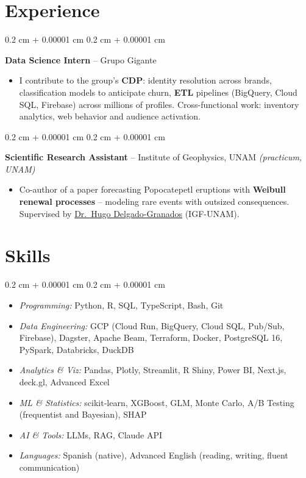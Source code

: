 \documentclass[10pt, letterpaper]{article}
\newenvironment{highlights}{
    \begin{itemize}[
        topsep=0.05 cm,
        parsep=0.05 cm,
        partopsep=0pt,
        itemsep=0pt,
        leftmargin=0.4 cm + 10pt
    ]
}{
    \end{itemize}
}
\newenvironment{highlightsforbulletentries}{
    \begin{itemize}[
        topsep=0.02 cm,
        parsep=0.05 cm,
        partopsep=0pt,
        itemsep=0pt,
        leftmargin=10pt
    ]
}{
    \end{itemize}
}
\newenvironment{onecolentry}{
    \begin{adjustwidth}{
        0.2 cm + 0.00001 cm
    }{
        0.2 cm + 0.00001 cm
    }
}{
    \end{adjustwidth}
}
\let\hrefWithoutArrow\href
\renewcommand{\href}[2]{\hrefWithoutArrow{#1}{\ifthenelse{\equal{#2}{}}{ }{#2 }\raisebox{.15ex}{\footnotesize \faExternalLink*}}}
\begin{document}
    \section{Experience}

        \begin{onecolentry}
            \textbf{Data Science Intern} -- Grupo Gigante
            \begin{highlights}
                \item I contribute to the group's \textbf{CDP}: identity resolution across brands, classification models to anticipate churn, \textbf{ETL} pipelines (BigQuery, Cloud SQL, Firebase) across millions of profiles. Cross-functional work: inventory analytics, web behavior and audience activation.
            \end{highlights}
            \end{onecolentry}

        \vspace{0.02 cm}

        \begin{onecolentry}
            \textbf{Scientific Research Assistant} -- Institute of Geophysics, UNAM \textit{(practicum, UNAM)}
            \begin{highlights}
                \item Co-author of a paper forecasting Popocatepetl eruptions with \textbf{Weibull renewal processes} -- modeling rare events with outsized consequences. Supervised by \hrefWithoutArrow{https://scholar.google.com/citations?user=lDD0DZQAAAAJ}{Dr.\ Hugo Delgado-Granados} (IGF-UNAM).
            \end{highlights}
            \end{onecolentry}


    \section{Skills}

\begin{onecolentry}
    \begin{highlightsforbulletentries}
        \item \textit{Programming:} Python, R, SQL, TypeScript, Bash, Git
        \item \textit{Data Engineering:} GCP (Cloud Run, BigQuery, Cloud SQL, Pub/Sub, Firebase), Dagster, Apache Beam, Terraform, Docker, PostgreSQL 16, PySpark, Databricks, DuckDB
        \item \textit{Analytics \& Viz:} Pandas, Plotly, Streamlit, R Shiny, Power BI, Next.js, deck.gl, Advanced Excel
        \item \textit{ML \& Statistics:} scikit-learn, XGBoost, GLM, Monte Carlo, A/B Testing (frequentist and Bayesian), SHAP
        \item \textit{AI \& Tools:} LLMs, RAG, Claude API
        \item \textit{Languages:} Spanish (native), Advanced English (reading, writing, fluent communication)
    \end{highlightsforbulletentries}
\end{onecolentry}
\end{document}
